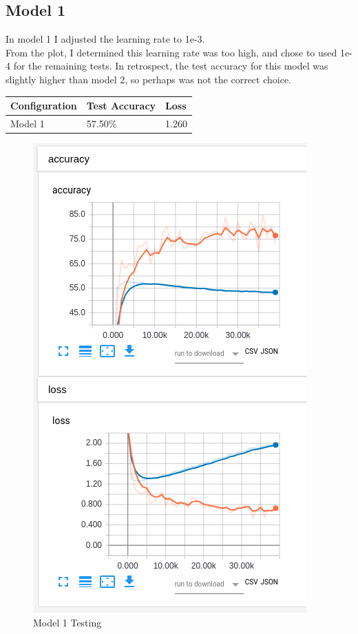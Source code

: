\documentclass[12pt, letter]{article}
\begin{document}
  \subsection{Model 1}
  In model 1 I adjusted the learning rate to {1e-3}. \\

  From the plot, I determined this learning rate was too high, and chose to used
  {1e-4} for the remaining tests. In retrospect, the test accuracy for this
  model was slightly higher than model 2, so perhaps was not the correct choice. \\

  \begin{tabular}{lll}
    Configuration  & Test Accuracy & Loss  \\
    \hline
    Model 1        & 57.50\%        & 1.260
  \end{tabular}

  \begin{figure}[H]
    \centering
    \includegraphics[width=0.8 \textwidth]{lr1e3}
    \caption{Model 1 Testing}
    \label{fig:eg}
  \end{figure}
\end{document}
